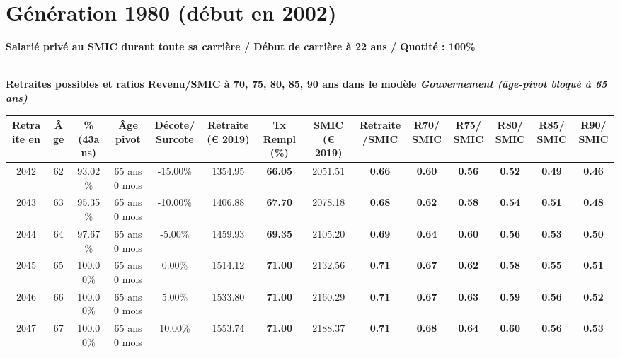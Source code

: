 \newpage 
 
\section{Génération 1980 (début en 2002)\label{SMIC_100_1980_22_0}} 
 
{\bf \noindent Salarié privé au SMIC durant toute sa carrière / Début de carrière à 22 ans / Quotité : 100\%}  ~ 

 ~\\{\bf \noindent Retraites possibles et ratios Revenu/SMIC à 70, 75, 80, 85, 90 ans dans le modèle \emph{Gouvernement (âge-pivot bloqué à 65 ans)}}  
 
\begin{adjustbox}{max width=\textwidth} 
\begin{tabular}[htb]{|c|c||c|c|c||c|c||c|c||c|c|c|c|c|} 
\hline 
 Retraite en &  Âge &  \%(43ans) &  Âge pivot &  Décote/Surcote &  Retraite (\euro{} 2019) &  Tx Rempl(\%) &  SMIC (\euro{} 2019) &  Retraite/SMIC &  R70/SMIC &  R75/SMIC &  R80/SMIC &  R85/SMIC &  R90/SMIC \\ 
\hline \hline 
 2042 &  62 &  93.02\% &  65 ans 0 mois &  -15.00\% &  1354.95 &  {\bf 66.05} &  2051.51 &  {\bf {\color{red} 0.66}} &  {\bf {\color{red} 0.60}} &  {\bf {\color{red} 0.56}} &  {\bf {\color{red} 0.52}} &  {\bf {\color{red} 0.49}} &  {\bf {\color{red} 0.46}} \\ 
\hline 
 2043 &  63 &  95.35\% &  65 ans 0 mois &  -10.00\% &  1406.88 &  {\bf 67.70} &  2078.18 &  {\bf {\color{red} 0.68}} &  {\bf {\color{red} 0.62}} &  {\bf {\color{red} 0.58}} &  {\bf {\color{red} 0.54}} &  {\bf {\color{red} 0.51}} &  {\bf {\color{red} 0.48}} \\ 
\hline 
 2044 &  64 &  97.67\% &  65 ans 0 mois &  -5.00\% &  1459.93 &  {\bf 69.35} &  2105.20 &  {\bf {\color{red} 0.69}} &  {\bf {\color{red} 0.64}} &  {\bf {\color{red} 0.60}} &  {\bf {\color{red} 0.56}} &  {\bf {\color{red} 0.53}} &  {\bf {\color{red} 0.50}} \\ 
\hline 
 2045 &  65 &  100.00\% &  65 ans 0 mois &  0.00\% &  1514.12 &  {\bf 71.00} &  2132.56 &  {\bf {\color{red} 0.71}} &  {\bf {\color{red} 0.67}} &  {\bf {\color{red} 0.62}} &  {\bf {\color{red} 0.58}} &  {\bf {\color{red} 0.55}} &  {\bf {\color{red} 0.51}} \\ 
\hline 
 2046 &  66 &  100.00\% &  65 ans 0 mois &  5.00\% &  1533.80 &  {\bf 71.00} &  2160.29 &  {\bf {\color{red} 0.71}} &  {\bf {\color{red} 0.67}} &  {\bf {\color{red} 0.63}} &  {\bf {\color{red} 0.59}} &  {\bf {\color{red} 0.56}} &  {\bf {\color{red} 0.52}} \\ 
\hline 
 2047 &  67 &  100.00\% &  65 ans 0 mois &  10.00\% &  1553.74 &  {\bf 71.00} &  2188.37 &  {\bf {\color{red} 0.71}} &  {\bf {\color{red} 0.68}} &  {\bf {\color{red} 0.64}} &  {\bf {\color{red} 0.60}} &  {\bf {\color{red} 0.56}} &  {\bf {\color{red} 0.53}} \\ 
\hline 
\hline 
\end{tabular} 
\end{adjustbox} 
 
